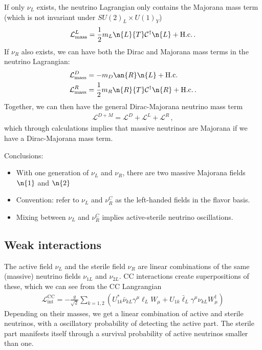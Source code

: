 \documentclass[twocolumn]{article}
\begin{document}
If only $\nu_L$ exists, the neutrino Lagrangian only contains the Majorana mass term (which is not invariant under $SU(2)_L \times U(1)_Y$)
\begin{align*}
  \mathcal{L}^L_\text{mass} = \frac{1}{2} m_L \n{L}{T} \mathcal{C}^\dagger \n{L} + \text{H.c.}\,.
\end{align*}
If $\nu_R$ also exists, we can have both the Dirac and Majorana mass terms in the neutrino Lagrangian:
\begin{align*}
  \mathcal{L}^D_\text{mass} &= -m_D \an{R} \n{L} + \text{H.c.} \\
  \mathcal{L}^R_\text{mass} &= \frac{1}{2}m_R \n{R}{T} \mathcal{C}^\dagger \n{R} + \text{H.c.}\,.
\end{align*}
Together, we can then have the general Dirac-Majorana neutrino mass term 
\begin{align*}
  \mathcal{L}^{D+M} = \mathcal{L}^D + \mathcal{L}^L + \mathcal{L}^R\,,
\end{align*}
which through calculations implies that massive neutrinos are Majorana if we have a Dirac-Majorana mass term.

Conclusions:
\begin{itemize}
  \item With one generation of $\nu_L$ and $\nu_R$, there are two massive Majorana fields $\n{1}$ and $\n{2}$
  \item Convention: refer to $\nu_L$ and $\nu_R^C$ as the left-handed fields in the flavor basis.
  \item Mixing between $\nu_L$ and $\nu_R^C$ implies active-sterile neutrino oscillations.
\end{itemize}

\subsection{Weak interactions}
The active field $\nu_L$ and the sterile field $\nu_R$ are linear combinations of the same (massive) neutrino fields $\nu_{1L}$ and $\nu_{2L}$. CC interactions create superpositions of these, which we can see from the CC Langrangian
\begin{align*}
  \mathcal{L}^\text{CC}_\text{int} = -\frac{g}{\sqrt{2}} \sum_{k=1,2} (U^*_{1k}\bar{\nu}_{kL}\gamma^\mu \ell_L W_\mu + U_{1k}\bar{\ell}_L \gamma^\mu \nu_{kL} W^\dagger_\mu)
\end{align*}
Depending on their masses, we get a linear combination of active and sterile neutrinos, with a oscillatory probability of detecting the active part. The sterile part manifests itself through a survival probability of active neutrinos smaller than one.
\end{document}
